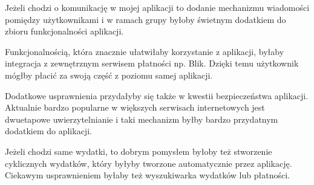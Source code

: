 \documentclass[
    left=2.5cm,         %
    right=2.5cm,        %
    top=2.5cm,          %
    bottom=3cm,         %
    bindingoffset=6mm,  %
    nohyphenation=false %
]{eiti/eiti-thesis}
\begin{document}
  Jeżeli chodzi o komunikację w mojej aplikacji to dodanie mechanizmu wiadomości pomiędzy użytkownikami i w ramach grupy byłoby świetnym dodatkiem do zbioru funkcjonalności aplikacji.

  Funkcjonalnością, która znacznie ułatwiłaby korzystanie z aplikacji, byłaby integracja z zewnętrznym serwisem płatności np. Blik. Dzięki temu użytkownik mógłby płacić za swoją część z poziomu samej aplikacji.

  Dodatkowe usprawnienia przydałyby się także w kwestii bezpieczeństwa aplikacji. Aktualnie bardzo popularne w większych serwisach internetowych jest dwuetapowe uwierzytelnianie i taki mechanizm byłby bardzo przydatnym dodatkiem do aplikacji.

  Jeżeli chodzi same wydatki, to dobrym pomysłem byłoby też stworzenie cyklicznych wydatków, który byłyby tworzone automatycznie przez aplikację. Ciekawym usprawnieniem byłaby też wyszukiwarka wydatków lub płatności. 


\cleardoublepage %
\printbibliography


\newpage
\pagestyle{plain}

\vspace{0.8cm}

\listoffigurestoc     %
\vspace{1cm}          %
\lstlistoflistings    %
\vspace{1cm}          %

\end{document}
